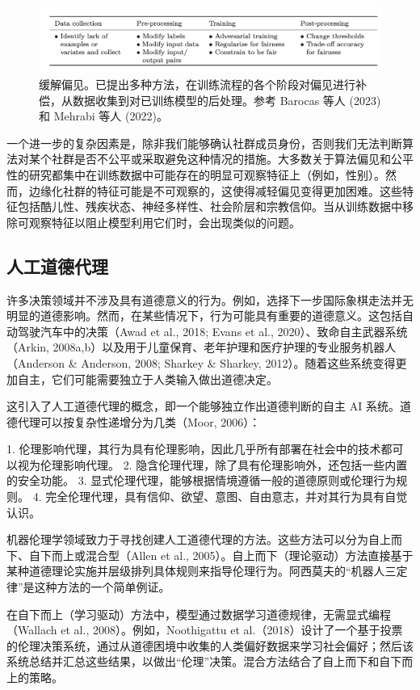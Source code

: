 \begin{figure}[ht!]
\centering
\includegraphics[width=0.7\linewidth]{png/chapter21/212.png}
\caption{缓解偏见。已提出多种方法，在训练流程的各个阶段对偏见进行补偿，从数据收集到对已训练模型的后处理。参考 Barocas 等人 (2023) 和 Mehrabi 等人 (2022)。}
\end{figure}

一个进一步的复杂因素是，除非我们能够确认社群成员身份，否则我们无法判断算法对某个社群是否不公平或采取避免这种情况的措施。大多数关于算法偏见和公平性的研究都集中在训练数据中可能存在的明显可观察特征上（例如，性别）。然而，边缘化社群的特征可能是不可观察的，这使得减轻偏见变得更加困难。这些特征包括酷儿性、残疾状态、神经多样性、社会阶层和宗教信仰。当从训练数据中移除可观察特征以阻止模型利用它们时，会出现类似的问题。

\subsection{人工道德代理}
许多决策领域并不涉及具有道德意义的行为。例如，选择下一步国际象棋走法并无明显的道德影响。然而，在某些情况下，行为可能具有重要的道德意义。这包括自动驾驶汽车中的决策（Awad et al., 2018; Evans et al., 2020）、致命自主武器系统（Arkin, 2008a,b）以及用于儿童保育、老年护理和医疗护理的专业服务机器人（Anderson \& Anderson, 2008; Sharkey \& Sharkey, 2012）。随着这些系统变得更加自主，它们可能需要独立于人类输入做出道德决定。

这引入了人工道德代理的概念，即一个能够独立作出道德判断的自主 AI 系统。道德代理可以按复杂性递增分为几类（Moor, 2006）：

1. 伦理影响代理，其行为具有伦理影响，因此几乎所有部署在社会中的技术都可以视为伦理影响代理。
2. 隐含伦理代理，除了具有伦理影响外，还包括一些内置的安全功能。
3. 显式伦理代理，能够根据情境遵循一般的道德原则或伦理行为规则。
4. 完全伦理代理，具有信仰、欲望、意图、自由意志，并对其行为具有自觉认识。

机器伦理学领域致力于寻找创建人工道德代理的方法。这些方法可以分为自上而下、自下而上或混合型（Allen et al., 2005）。自上而下（理论驱动）方法直接基于某种道德理论实施并层级排列具体规则来指导伦理行为。阿西莫夫的“机器人三定律”是这种方法的一个简单例证。

在自下而上（学习驱动）方法中，模型通过数据学习道德规律，无需显式编程（Wallach et al., 2008）。例如，Noothigattu et al.（2018）设计了一个基于投票的伦理决策系统，通过从道德困境中收集的人类偏好数据来学习社会偏好；然后该系统总结并汇总这些结果，以做出“伦理”决策。混合方法结合了自上而下和自下而上的策略。

